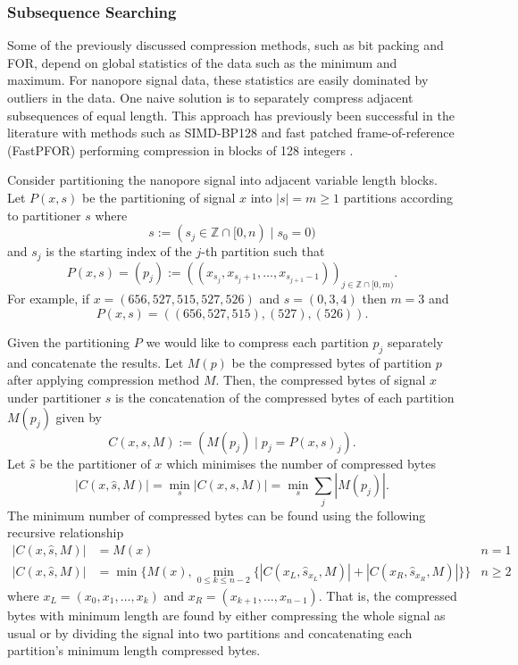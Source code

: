 \subsubsection{Subsequence Searching}
Some of the previously discussed compression methods, such as bit packing and FOR, depend on global statistics of the data such as the minimum and maximum.
For nanopore signal data, these statistics are easily dominated by outliers in the data.
One naive solution is to separately compress adjacent subsequences of equal length.
This approach has previously been successful in the literature with methods such as SIMD-BP128 and fast patched frame-of-reference (FastPFOR) performing compression in blocks of 128 integers \cite{lemire-simd}.


Consider partitioning the nanopore signal into adjacent variable length blocks.
Let $P(x,s)$ be the partitioning of signal $x$ into $|s|=m\ge 1$ partitions according to partitioner $s$ where
\[ s := (s_j \in \mathbb{Z}\cap [0, n) \mid s_0 = 0)\]
and $s_j$ is the starting index of the $j$-th partition such that
\[ P(x,s) = (p_j) := ((x_{s_j},x_{s_j+1},\dots,x_{s_{j+1}-1}))_{j\in\mathbb{Z}\cap[0,m)}.\]
For example, if $x=(656,527,515,527,526)$ and $s = (0,3,4)$ then $m=3$ and
\[P(x,s)=((656,527,515),(527),(526)).\]

Given the partitioning $P$ we would like to compress each partition $p_j$ separately and concatenate the results.
Let $M(p)$ be the compressed bytes of partition $p$ after applying compression method $M$.
Then, the compressed bytes of signal $x$ under partitioner $s$ is the concatenation of the compressed bytes of each partition $M(p_j)$ given by
\[ C(x,s,M) := (M(p_j)\mid p_j=P(x,s)_j). \]
Let $\hat s$ be the partitioner of $x$ which minimises the number of compressed bytes
\[ |C(x,\hat s,M)| = \min_s |C(x,s,M)| = \min_s \sum_j|M(p_j)|. \]
The minimum number of compressed bytes can be found using the following recursive relationship
\begin{align*}
	|C(x,\hat s,M)| &= M(x) & n = 1\\
	|C(x,\hat s,M)| &= \min\{M(x),\min_{0\le k\le n-2}\{|C(x_L,\hat s_{x_L},M)| + |C(x_R,\hat s_{x_R},M)|\}\} & n\ge 2
\end{align*}
where $x_L=(x_0,x_1,\dots,x_k)$ and $x_R=(x_{k+1},\dots,x_{n-1})$.
That is, the compressed bytes with minimum length are found by either compressing the whole signal as usual or by dividing the signal into two partitions and concatenating each partition's minimum length compressed bytes.

